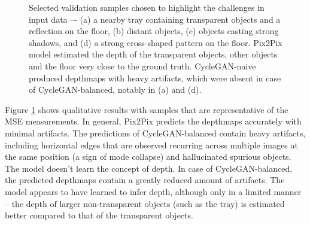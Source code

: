 \begin{figure}[h!]
    \centering
    \caption{Selected validation samples chosen to highlight the challenges in input data –- (a) a nearby tray containing transparent objects and a reflection on the floor, (b) distant objects, (c) objects casting strong shadows, and (d) a strong cross-shaped pattern on the floor. Pix2Pix model estimated the depth of the transparent objects, other objects and the floor very close to the ground truth. CycleGAN-naive produced depthmaps with heavy artifacts, which were absent in case of CycleGAN-balanced, notably in (a) and (d).}
    \label{fig:cleargrasp_qual}
\end{figure}

Figure \ref{fig:cleargrasp_qual} shows qualitative results with samples that are representative of the MSE measurements. In general, Pix2Pix predicts the depthmaps accurately with minimal artifacts. The predictions of CycleGAN-balanced contain heavy artifacts, including horizontal edges that are observed recurring across multiple images at the same position (a sign of mode collapse) and hallucinated spurious objects. The model doesn't learn the concept of depth. In case of CycleGAN-balanced, the predicted depthmaps contain a greatly reduced amount of artifacts. The model appears to have learned to infer depth, although only in a limited manner -- the depth of larger non-transparent objects (such as the tray) is estimated better compared to that of the transparent objects.

